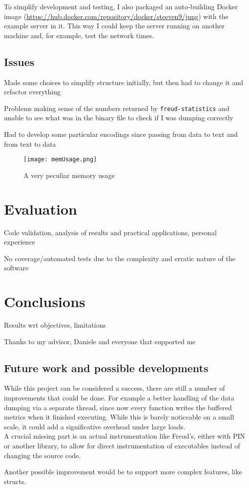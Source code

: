         To simplify development and testing, I also packaged an auto-building Docker image 
        (\url{https://hub.docker.com/repository/docker/steeven9/jung}) with the example server in it.
        This way I could keep the server running on another machine and, for example, test the network times.


    \section{Issues}

        Made some choices to simplify structure initially, but then had to change it and
        refactor everything

        Problems making sense of the numbers returned by \texttt{freud-statistics} and unable
        to see what was in the binary file to check if I was dumping correctly

        Had to develop some particular encodings since passing from data to text and from text
        to data

        \begin{figure}[H]
            \centering
            \texttt{[image: memUsage.png]}
            \caption{A very peculiar memory usage}
            \label{fig:memUsage}
        \end{figure}


\chapter{Evaluation}

    Code validation, analysis of results and practical applications, personal experience

    No coverage/automated tests due to the complexity and erratic nature of the software


\chapter{Conclusions}

    Results wrt objectives, limitations

    Thanks to my advisor, Daniele and everyone that supported me


	\section{Future work and possible developments}

        While this project can be considered a success, there are still a number of improvements
        that could be done. For example a better handling of the data dumping via a separate thread,
        since now every function writes the buffered metrics when it finished executing. While this
        is barely noticeable on a small scale, it could add a significative overhead under large loads.\\

        A crucial missing part is an actual instrumentation like Freud's, either with PIN or another
        library, to allow for direct instrumentation of executables instead of changing the source code.

        Another possible improvement would be to support more complex features, like structs.
